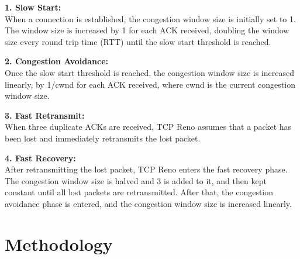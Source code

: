 \documentclass[11pt]{article}
\begin{document}
\textbf{1. Slow Start:}\\[12pt]  
When a connection is established, the congestion window size is initially set to 1. The window size is increased by 1 for each ACK received, doubling the window size every round trip time (RTT) until the slow start threshold is reached.

\newpage
\textbf{2. Congestion Avoidance:}\\[12pt] 
Once the slow start threshold is reached, the congestion window size is increased linearly, by
1/cwnd for each ACK received, where cwnd is the current congestion window size.

\textbf{3. Fast Retransmit: }\\[12pt]
When three duplicate ACKs are received, TCP Reno assumes that a packet has been lost and immediately retransmits the lost packet.

\textbf{4. Fast Recovery: }\\[12pt]
After retransmitting the lost packet, TCP Reno enters the fast recovery phase. The congestion window size is halved and 3 is added to it, and then kept constant until all lost packets are retransmitted. After that, the congestion avoidance phase is entered, and the congestion window size is increased linearly.


\section{Methodology}
\end{document}
